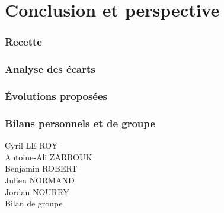 \part{Conclusion et perspective}
\section{Recette}
\section{Analyse des écarts}
\section{Évolutions proposées}
\section{Bilans personnels et de groupe}

\begin{description}
	\item[Cyril LE ROY]
	\item[Antoine-Ali ZARROUK]
	\item[Benjamin ROBERT]
	\item[Julien NORMAND]
	\item[Jordan NOURRY]
	\item[Bilan de groupe]
\end{description}
